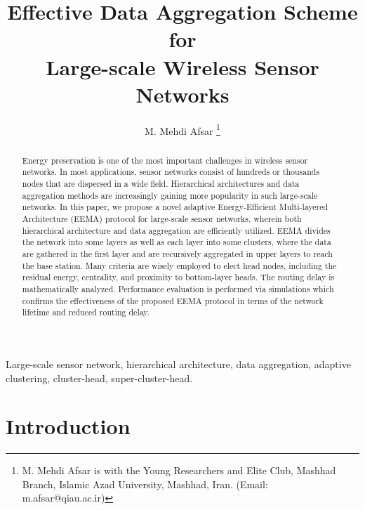 \documentclass[journal]{IEEEtran}
\begin{document}
\title{Effective Data Aggregation Scheme for \\Large-scale Wireless Sensor Networks}

\author{M. Mehdi Afsar 
\thanks{M. Mehdi Afsar is with the Young Researchers and Elite Club, Mashhad Branch, Islamic Azad University, Mashhad, Iran. (Email: m.afsar@qiau.ac.ir)}
}










\maketitle


\begin{abstract}
 Energy preservation is one of the most important challenges in wireless sensor networks. In most applications, sensor networks consist of hundreds or thousands nodes that are dispersed in a wide field. Hierarchical architectures and data aggregation methods are increasingly gaining more popularity in such large-scale networks.  In this paper, we propose a novel adaptive Energy-Efficient Multi-layered Architecture (EEMA) protocol for large-scale sensor networks, wherein both hierarchical architecture and data aggregation are efficiently utilized. EEMA divides the network into some layers as well as each layer into some clusters,  where the data are gathered in the first layer and are recursively aggregated in upper layers to reach the base station.  Many criteria are wisely employed to elect head nodes, including the residual energy, centrality, and proximity to bottom-layer heads.  The routing delay is mathematically analyzed.  Performance evaluation is performed via simulations which confirms the effectiveness of the proposed EEMA protocol in terms of the network lifetime and reduced routing delay. 
\end{abstract}

\begin{IEEEkeywords}
Large-scale sensor network, hierarchical architecture, data aggregation, adaptive clustering, cluster-head, super-cluster-head.
\end{IEEEkeywords}

\IEEEpeerreviewmaketitle



\section{Introduction}
\label{sec:intro}
\end{document}
